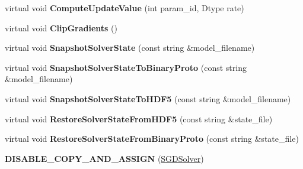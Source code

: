 \begin{DoxyCompactItemize}
virtual void {\bfseries Compute\+Update\+Value} (int param\+\_\+id, Dtype rate)
\item 
\mbox{\label{classcaffe_1_1_s_g_d_solver_af5e79b4aa5f832293681ee974e5d8d3a}} 
virtual void {\bfseries Clip\+Gradients} ()
\item 
\mbox{\label{classcaffe_1_1_s_g_d_solver_a0d91394a22bd7be3232e5a121c42dc60}} 
virtual void {\bfseries Snapshot\+Solver\+State} (const string \&model\+\_\+filename)
\item 
\mbox{\label{classcaffe_1_1_s_g_d_solver_a6431b1502f809305fd3ca9c3fcfd6ad8}} 
virtual void {\bfseries Snapshot\+Solver\+State\+To\+Binary\+Proto} (const string \&model\+\_\+filename)
\item 
\mbox{\label{classcaffe_1_1_s_g_d_solver_a82543773ca68d9e89370a94181a86fae}} 
virtual void {\bfseries Snapshot\+Solver\+State\+To\+H\+D\+F5} (const string \&model\+\_\+filename)
\item 
\mbox{\label{classcaffe_1_1_s_g_d_solver_a2097d6c51599d46f3c3160f7fe2f9bc7}} 
virtual void {\bfseries Restore\+Solver\+State\+From\+H\+D\+F5} (const string \&state\+\_\+file)
\item 
\mbox{\label{classcaffe_1_1_s_g_d_solver_a70be04550fdeaee0e4f16efd2370d06c}} 
virtual void {\bfseries Restore\+Solver\+State\+From\+Binary\+Proto} (const string \&state\+\_\+file)
\item 
\mbox{\label{classcaffe_1_1_s_g_d_solver_a4b37f2267ebd84e62ee486470b2b0c2b}} 
{\bfseries D\+I\+S\+A\+B\+L\+E\+\_\+\+C\+O\+P\+Y\+\_\+\+A\+N\+D\+\_\+\+A\+S\+S\+I\+GN} (\mbox{\hyperlink{classcaffe_1_1_s_g_d_solver}{S\+G\+D\+Solver}})
\end{DoxyCompactItemize}
